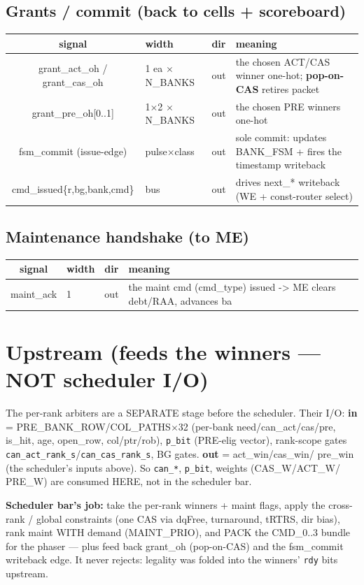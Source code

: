 \documentclass[9pt]{extarticle}
\newenvironment{io}{%
  \footnotesize\begin{longtable}{S W P M}
  \rowcolor{hb}\textbf{signal} & \textbf{width} & \textbf{dir} & \textbf{meaning}\\ \midrule\endhead}
  {\bottomrule\end{longtable}}
\begin{document}
\subsection{Grants / commit  (back to cells + scoreboard)}
\begin{io}
grant\_act\_oh / grant\_cas\_oh & 1 ea $\times$N\_BANKS & \textcolor{outg}{out} & the chosen ACT/CAS winner one-hot; \textbf{pop-on-CAS} retires packet\\
grant\_pre\_oh[0..1] & 1$\times$2 $\times$N\_BANKS & \textcolor{outg}{out} & the chosen PRE winners one-hot\\
fsm\_commit (issue-edge) & pulse$\times$class & \textcolor{outg}{out} & sole commit: updates BANK\_FSM + fires the timestamp writeback\\
cmd\_issued\{r,bg,bank,cmd\} & bus & \textcolor{outg}{out} & drives next\_* writeback (WE + const-router select)\\
\end{io}
\subsection{Maintenance handshake  (to ME)}
\begin{io}
maint\_ack & 1 & \textcolor{outg}{out} & the maint cmd (cmd\_type) issued -> ME clears debt/RAA, advances ba\\
\end{io}

\vspace{4pt}
\section*{Upstream (feeds the winners --- NOT scheduler I/O)}
{\footnotesize The per-rank arbiters are a SEPARATE stage before the scheduler. Their I/O:
\textbf{in} = PRE\_BANK\_ROW/COL\_PATHS$\times$32 (per-bank need/can\_act/cas/pre, is\_hit, age,
open\_row, col/ptr/rob), \texttt{p\_bit} (PRE-elig vector), rank-scope gates
\texttt{can\_act\_rank\_s}/\texttt{can\_cas\_rank\_s}, BG gates. \textbf{out} = act\_win/cas\_win/
pre\_win (the scheduler's inputs above). So \texttt{can\_*}, \texttt{p\_bit}, weights (CAS\_W/ACT\_W/
PRE\_W) are consumed HERE, not in the scheduler bar.}

\vspace{3pt}
{\footnotesize \textbf{Scheduler bar's job:} take the per-rank winners + maint flags, apply the
cross-rank / global constraints (one CAS via dqFree, turnaround, tRTRS, dir bias), rank maint WITH
demand (MAINT\_PRIO), and PACK the CMD\_0..3 bundle for the phaser --- plus feed back grant\_oh
(pop-on-CAS) and the fsm\_commit writeback edge. It never rejects: legality was folded into the
winners' \texttt{rdy} bits upstream.}
\end{document}
